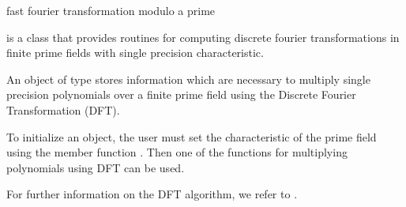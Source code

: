 

\NAME

 \dotfill fast fourier transformation modulo a prime



\ABSTRACT

 is a class that provides routines for computing discrete fourier
transformations in finite prime fields with single precision characteristic.



\DESCRIPTION

An object of type  stores information which are necessary to multiply single
precision polynomials over a finite prime field using the Discrete Fourier Transformation (DFT).

To initialize an  object, the user must set the characteristic of the prime
field using the member function .  Then one of the functions for multiplying
polynomials using DFT can be used.

For further information on the DFT algorithm, we refer to \cite{Cormen/Leiserson/Rivest:1990}.

